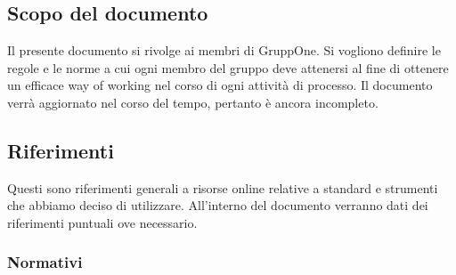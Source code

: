 \documentclass[../norme-di-progetto.tex]{subfiles}
\begin{document}
\subsection{Scopo del documento}%
\label{sub:scopo_del_documento}

Il presente documento si rivolge ai membri di GruppOne.
Si vogliono definire le regole e le norme a cui ogni membro del gruppo deve attenersi al fine di ottenere un efficace way of working nel corso di ogni attività di processo.
Il documento verrà aggiornato nel corso del tempo, pertanto è ancora incompleto.

\scopoDelProdottoEGlossario{}






\subsection{Riferimenti}%
\label{sub:riferimenti}

Questi sono riferimenti generali a risorse online relative a standard e strumenti che abbiamo deciso di utilizzare.
All'interno del documento verranno dati dei riferimenti puntuali ove necessario.

\subsubsection{Normativi}%
\label{subs:riferimenti/normativi}
\end{document}
